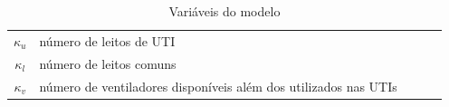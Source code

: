 \documentclass[12pt,letterpaper]{article}
\begin{document}
\begin{table}[h]
\begin{tabular}{|c|p{10cm}|p{4cm}|l|l}
		$\kappa_u$     & número de leitos de UTI                                                               &                           &             &   \\ \cline{1-4}              
		$\kappa_l$     & número de leitos comuns                                                               &                           &             &   \\ \cline{1-4}              
		$\kappa_v$     & número de ventiladores disponíveis  além dos utilizados nas UTIs                    &                           &             &   \\ \cline{1-4}        
	\end{tabular}
	\caption{ Variáveis do modelo}
\end{table}

	
	
	
% 
% 
\end{document}
